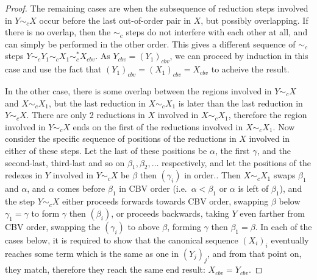 \begin{proof}
The remaining cases are when the subsequence of reduction steps involved in $Y \sim_c X$ occur before the last out-of-order pair in $X$, but possibly overlapping. If there is no overlap, then the $\sim_c$ steps do not interfere with each other at all, and can simply be performed in the other order. This gives a different sequence of $\sim_c$ steps $Y \sim_c Y_1 \sim_c X_1 \sim_c^* X_{cbv}$. As $Y_{cbv} = (Y_1)_{cbv}$, we can proceed by induction in this case and use the fact that $(Y_1)_{cbv} = (X_1)_{cbv} = X_{cbv}$ to acheive the result.

In the other case, there is some overlap between the regions involved in $Y \sim_c X$ and $X \sim_c X_1$, but the last reduction in $X \sim_c X_1$ is later than the last reduction in $Y \sim_c X$. There are only 2 reductions in $X$ involved in $X \sim_c X_1$, therefore the region involved in $Y \sim_c X$ ends on the first of the reductions involved in $X \sim_c X_1$. Now consider the specific sequence of positions of the reductions in $X$ involved in either of these steps. Let the last of these positions be $\alpha$, the first $\gamma$, and the second-last, third-last and so on $\beta_1, \beta_2, \dots$ respectively, and let the positions of the redexes in $Y$ involved in $Y \sim_c X$ be $\beta$ then $(\gamma_i)$ in order.. Then $X \sim_c X_1$ swaps $\beta_1$ and $\alpha$, and $\alpha$ comes before $\beta_1$ in CBV order (i.e.~$\alpha < \beta_1$ or $\alpha$ is left of $\beta_1$), and the step $Y \sim_c X$ either proceeds forwards towards CBV order, swapping $\beta$ below $\gamma_1 = \gamma$ to form $\gamma$ then $(\beta_i)$, or proceeds backwards, taking $Y$ even farther from CBV order, swapping the $(\gamma_i)$ to above $\beta$, forming $\gamma$ then $\beta_1 = \beta$. In each of the cases below, it is required to show that the canonical sequence $(X_i)_i$ eventually reaches some term which is the same as one in $(Y_j)_j$, and from that point on, they match, therefore they reach the same end result: $X_{cbv} = Y_{cbv}$.


\end{proof}
